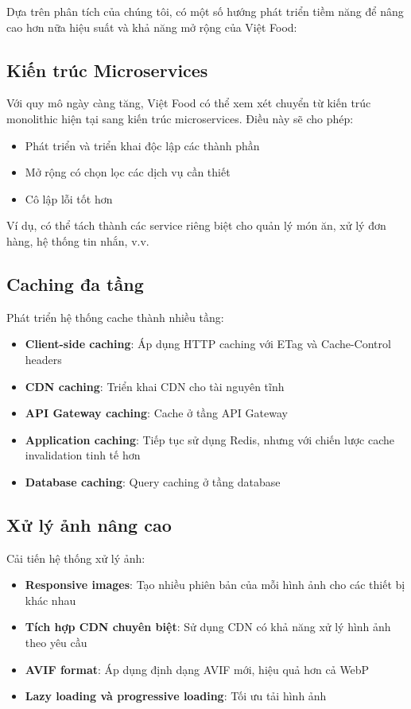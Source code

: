 Dựa trên phân tích của chúng tôi, có một số hướng phát triển tiềm năng để nâng cao hơn nữa hiệu suất và khả năng mở rộng của Việt Food:

\subsection{Kiến trúc Microservices}
Với quy mô ngày càng tăng, Việt Food có thể xem xét chuyển từ kiến trúc monolithic hiện tại sang kiến trúc microservices. Điều này sẽ cho phép:
\begin{itemize}
    \item Phát triển và triển khai độc lập các thành phần
    \item Mở rộng có chọn lọc các dịch vụ cần thiết
    \item Cô lập lỗi tốt hơn
\end{itemize}

Ví dụ, có thể tách thành các service riêng biệt cho quản lý món ăn, xử lý đơn hàng, hệ thống tin nhắn, v.v.

\subsection{Caching đa tầng}
Phát triển hệ thống cache thành nhiều tầng:
\begin{itemize}
    \item \textbf{Client-side caching}: Áp dụng HTTP caching với ETag và Cache-Control headers
    \item \textbf{CDN caching}: Triển khai CDN cho tài nguyên tĩnh
    \item \textbf{API Gateway caching}: Cache ở tầng API Gateway
    \item \textbf{Application caching}: Tiếp tục sử dụng Redis, nhưng với chiến lược cache invalidation tinh tế hơn
    \item \textbf{Database caching}: Query caching ở tầng database
\end{itemize}

\subsection{Xử lý ảnh nâng cao}
Cải tiến hệ thống xử lý ảnh:
\begin{itemize}
    \item \textbf{Responsive images}: Tạo nhiều phiên bản của mỗi hình ảnh cho các thiết bị khác nhau
    \item \textbf{Tích hợp CDN chuyên biệt}: Sử dụng CDN có khả năng xử lý hình ảnh theo yêu cầu
    \item \textbf{AVIF format}: Áp dụng định dạng AVIF mới, hiệu quả hơn cả WebP
    \item \textbf{Lazy loading và progressive loading}: Tối ưu tải hình ảnh
\end{itemize}

